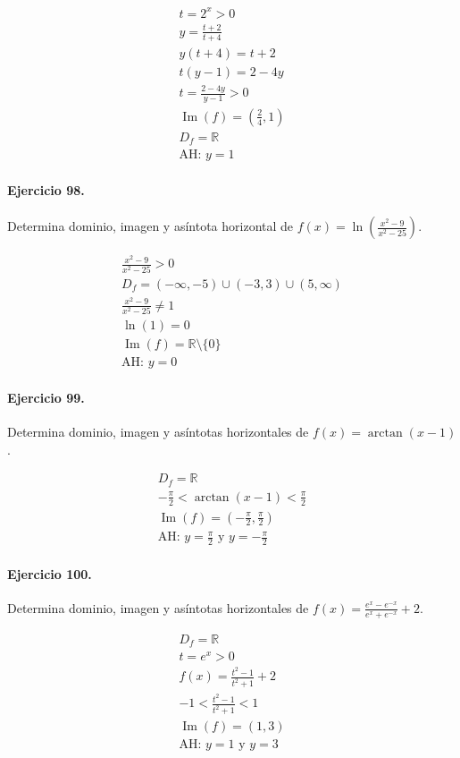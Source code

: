 \documentclass[11pt,a4paper]{article}
\begin{document}
\[
\begin{aligned}
t=2^x>0\\
y=\frac{t+2}{t+4}\\
y(t+4)=t+2\\
t(y-1)=2-4y\\
t=\frac{2-4y}{y-1}>0\\
\operatorname{Im}(f)=(\frac{2}{4},1)\\
D_f=\mathbb{R}\\
\text{{AH: }}y=1
\end{aligned}
\]


\paragraph{Ejercicio 98.} Determina dominio, imagen y asíntota horizontal de $f(x)=\ln\left(\frac{x^2-9}{x^2-25}\right)$.

\[
\begin{aligned}
\frac{x^2-9}{x^2-25} >0\\
D_f=(-\infty,-5)\cup(-3,3)\cup(5,\infty)\\
\frac{x^2-9}{x^2-25}\ne1\\
\ln(1)=0\\
\operatorname{Im}(f)=\mathbb{R}\setminus\{0\}\\
\text{{AH: }}y=0
\end{aligned}
\]


\paragraph{Ejercicio 99.} Determina dominio, imagen y asíntotas horizontales de $f(x)=\arctan(x-1)$.

\[
\begin{aligned}
D_f=\mathbb{R}\\
-\frac{\pi}{2}<\arctan(x-1)<\frac{\pi}{2}\\
\operatorname{Im}(f)=\left(-\frac{\pi}{2},\frac{\pi}{2}\right)\\
\text{AH: }y=\frac{\pi}{2}\text{ y }y=-\frac{\pi}{2}
\end{aligned}
\]


\paragraph{Ejercicio 100.} Determina dominio, imagen y asíntotas horizontales de $f(x)=\frac{e^x-e^{-x}}{e^x+e^{-x}}+2$.

\[
\begin{aligned}
D_f=\mathbb{R}\\
t=e^x>0\\
f(x)=\frac{t^2-1}{t^2+1}+2\\
-1<\frac{t^2-1}{t^2+1}<1\\
\operatorname{Im}(f)=(1,3)\\
\text{AH: }y=1\text{ y }y=3
\end{aligned}
\]
\end{document}
